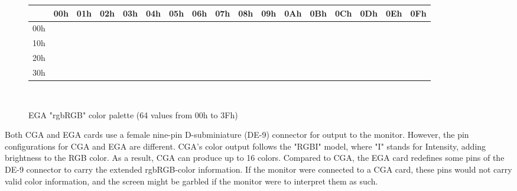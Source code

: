 \documentclass[book.tex]{subfiles}
\begin{document}
\begin{figure}[H]
\centering
\setlength{\tabcolsep}{2.8pt} %
\begin{tabular}{|c|c|c|c|c|c|c|c|c|c|c|c|c|c|c|c|c|}
\hline 
 & 00h & 01h & 02h & 03h & 04h & 05h & 06h & 07h & 08h & 09h & 0Ah & 0Bh & 0Ch & 0Dh & 0Eh & 0Fh \\ \hline
 00h & \cellcolor{CGA_Black} & \cellcolor{CGA_Blue} & \cellcolor{CGA_Green} & \cellcolor{CGA_Cyan} & \cellcolor{CGA_Red} & \cellcolor{CGA_Magenta} & \cellcolor{EGA_06} & \cellcolor{CGA_Light_Grey} & \cellcolor{EGA_08} & \cellcolor{EGA_09} & \cellcolor{EGA_0A} & \cellcolor{EGA_0B} & \cellcolor{EGA_0C} & \cellcolor{EGA_0D} & \cellcolor{EGA_0E} & \cellcolor{EGA_0F} \\ \hline

10h & \cellcolor{EGA_10} & \cellcolor{EGA_11} & \cellcolor{EGA_12} & \cellcolor{EGA_13} & \cellcolor{CGA_Brown} & \cellcolor{EGA_15} & \cellcolor{EGA_16} & \cellcolor{EGA_17} & \cellcolor{EGA_18} & \cellcolor{EGA_19} & \cellcolor{EGA_1A} & \cellcolor{EGA_1B} & \cellcolor{EGA_1C} & \cellcolor{EGA_1D} & \cellcolor{EGA_1E} & \cellcolor{EGA_1F} \\ \hline

20h & \cellcolor{EGA_20} & \cellcolor{EGA_21} & \cellcolor{EGA_22} & \cellcolor{EGA_23} & \cellcolor{EGA_24} & \cellcolor{EGA_25} & \cellcolor{EGA_26} & \cellcolor{EGA_27} & \cellcolor{EGA_28} & \cellcolor{EGA_29} & \cellcolor{EGA_2A} & \cellcolor{EGA_2B} & \cellcolor{EGA_2C} & \cellcolor{EGA_2D} & \cellcolor{EGA_2E} & \cellcolor{EGA_2F} \\ \hline

30h & \cellcolor{EGA_30} & \cellcolor{EGA_31} & \cellcolor{EGA_32} & \cellcolor{EGA_33} & \cellcolor{EGA_34} & \cellcolor{EGA_35} & \cellcolor{EGA_36} & \cellcolor{EGA_37} & \cellcolor{CGA_Dark_Grey} & \cellcolor{CGA_Bright_Blue} & \cellcolor{CGA_Bright_Green} & \cellcolor{CGA_Bright_Cyan} & \cellcolor{CGA_Bright_Red} & \cellcolor{CGA_Bright_Magenta} & \cellcolor{CGA_Bright_Brown} & \cellcolor{CGA_White} \\ \hline


\end{tabular}\\
\setlength{\tabcolsep}{6pt} %
\caption{EGA "rgbRGB" color palette (64 values from 00h to 3Fh)}
\end{figure}

\par
Both CGA and EGA cards use a female nine-pin D-subminiature (DE-9) connector for output to the monitor. However, the pin configurations for CGA and EGA are different. CGA’s color output follows the "RGBI" model, where "I" stands for Intensity, adding brightness to the RGB color. As a result, CGA can produce up to 16 colors. Compared to CGA, the EGA card redefines some pins of the DE-9 connector to carry the extended rgbRGB-color information. If the monitor were connected to a CGA card, these pins would not carry valid color information, and the screen might be garbled if the monitor were to interpret them as such.\\
\end{document}
